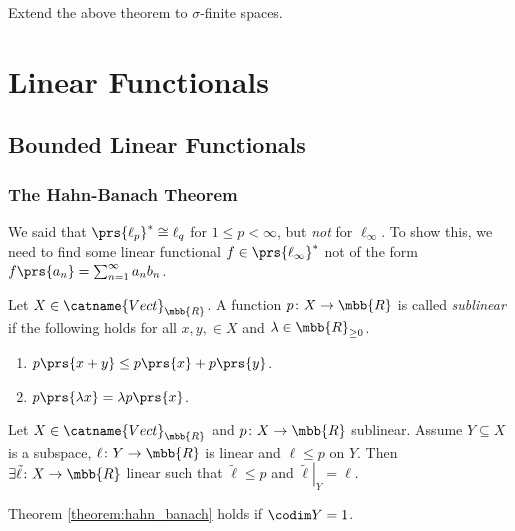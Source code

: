 \documentclass[10pt, twoside]{book}
\begin{document}
\begin{exercise}
Extend the above theorem to $\sigma$-finite spaces.
\end{exercise}

\chapter{Linear Functionals}

\section{Bounded Linear Functionals}

\subsection{The Hahn-Banach Theorem}

We said that $\prs{\ell_p}^* \cong \ell_q$ for $1 \leq p < \infty$, but \emph{not} for $\ell_\infty$.
To show this, we need to find some linear functional $f \in \prs{\ell_\infty}^*$ not of the form $f\prs{a_n} = \sum_{n=1}^{\infty} a_n b_n$.

\begin{definition}
Let $X \in \catname{Vect}_{\mbb{R}}$. A function $p \colon X \to \mbb{R}$ is called \emph{sublinear} if the following holds for all $x,y, \in X$ and $\lambda \in \mbb{R}_{\geq 0}$.
\begin{enumerate}
\item $p\prs{x+y} \leq p\prs{x} + p\prs{y}$.
\item $p\prs{\lambda x} = \lambda p\prs{x}$.
\end{enumerate}
\end{definition}

\begin{theorem} \label{theorem:hahn_banach}
Let $X \in \catname{Vect}_{\mbb{R}}$ and $p \colon X \to \mbb{R}$ sublinear. Assume $Y \subseteq X$ is a subspace, $\ell \colon Y \to \mbb{R}$ is linear and $\ell \leq p$ on $Y$. Then $\exists \tilde{\ell} \colon X \to \mbb{R}$ linear such that $\tilde{\ell} \leq p$ and $\left. \tilde{\ell} \right|_Y = \ell$.
\end{theorem}

\begin{lemma}\label{lemma:hahn_banach_lemma}
Theorem \ref{theorem:hahn_banach} holds if $\codim Y = 1$.
\end{lemma}
\end{document}
